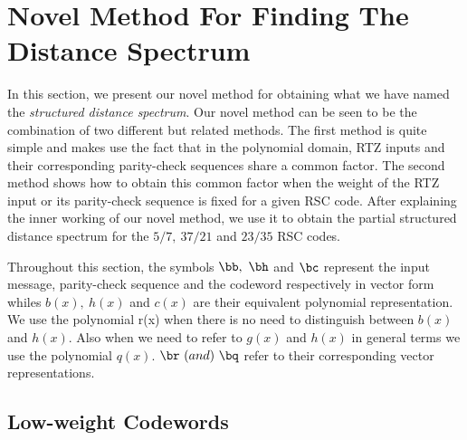 \section{Novel Method For Finding The Distance Spectrum}
\label{sec4}
In this section, we present our novel method for obtaining what we have named the \textit{structured distance spectrum}. Our novel method can be seen to be the combination of two different but related methods. The first method is quite simple and makes use the fact that in the polynomial domain, RTZ inputs and their corresponding parity-check sequences share a common factor. 
The second method shows how to obtain this common factor when the weight of the RTZ input or its parity-check sequence is fixed for a given RSC code. 
After explaining the inner working of our novel method, we use it to obtain the partial structured distance spectrum for the $5/7,~ 37/21$ and $23/35$  RSC codes.

Throughout this section, the symbols $\bb,~\bh$ and $\bc$ represent the input message, parity-check sequence and the codeword respectively in vector form whiles $b(x),~h(x)$ and $c(x)$ are their equivalent polynomial representation. We use the  polynomial r(x) when there is no need to distinguish between $b(x)$ and $h(x)$. Also when we need to refer to $g(x)$ and $h(x)$ in general terms we use the polynomial $q(x)$. $\br~ \text(and) ~\bq$ refer to their corresponding vector representations.

\subsection{Low-weight Codewords}

